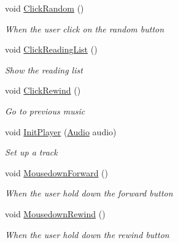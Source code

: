 \begin{DoxyCompactItemize}
void \hyperlink{class_presentation_1_1_view_model_1_1_player_view_model_ac07fc3f368638796014fac0079173b7f}{Click\+Random} ()
\begin{DoxyCompactList}\small\item\em When the user click on the random button \end{DoxyCompactList}\item 
void \hyperlink{class_presentation_1_1_view_model_1_1_player_view_model_a522861826c27d85dc5df4b9f629c4f14}{Click\+Reading\+List} ()
\begin{DoxyCompactList}\small\item\em Show the reading list \end{DoxyCompactList}\item 
void \hyperlink{class_presentation_1_1_view_model_1_1_player_view_model_a498f0356e1ea32517ac3f63d49de25b7}{Click\+Rewind} ()
\begin{DoxyCompactList}\small\item\em Go to previous music \end{DoxyCompactList}\item 
void \hyperlink{class_presentation_1_1_view_model_1_1_player_view_model_a0bb79b71a852316176dd3e8ff860a62f}{Init\+Player} (\hyperlink{class_d_t_o_1_1_audio}{Audio} audio)
\begin{DoxyCompactList}\small\item\em Set up a track \end{DoxyCompactList}\item 
void \hyperlink{class_presentation_1_1_view_model_1_1_player_view_model_a07da028812b546a5f7083cd1b460ddc7}{Mousedown\+Forward} ()
\begin{DoxyCompactList}\small\item\em When the user hold down the forward button \end{DoxyCompactList}\item 
void \hyperlink{class_presentation_1_1_view_model_1_1_player_view_model_a9239c10b2baf32dbec43fb6a15e902a8}{Mousedown\+Rewind} ()
\begin{DoxyCompactList}\small\item\em When the user hold down the rewind button \end{DoxyCompactList}\end{DoxyCompactItemize}
